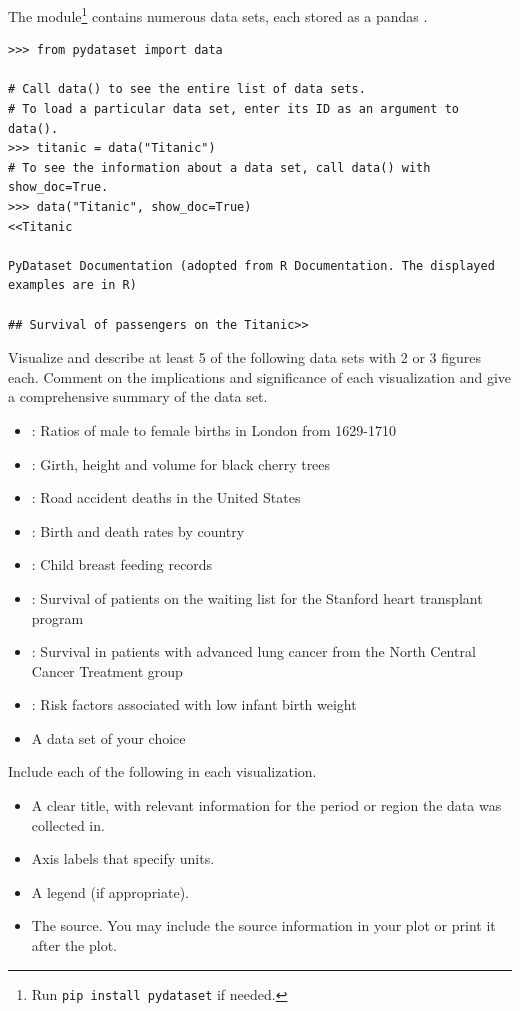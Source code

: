 \begin{problem}
The  module\footnote{Run \texttt{pip install pydataset} if needed.} contains numerous data sets, each stored as a pandas .

\begin{lstlisting}
>>> from pydataset import data

# Call data() to see the entire list of data sets.
# To load a particular data set, enter its ID as an argument to data().
>>> titanic = data("Titanic")
# To see the information about a data set, call data() with show_doc=True.
>>> data("Titanic", show_doc=True)
<<Titanic

PyDataset Documentation (adopted from R Documentation. The displayed
examples are in R)

## Survival of passengers on the Titanic>>
\end{lstlisting}

Visualize and describe at least 5 of the following data sets with 2 or 3 figures each.
Comment on the implications and significance of each visualization and give a comprehensive summary of the data set.

\begin{itemize}
\item {}: Ratios of male to female births in London from 1629-1710
\item {}: Girth, height and volume for black cherry trees
\item {}: Road accident deaths in the United States
\item {}: Birth and death rates by country
\item {}: Child breast feeding records
\item {}: Survival of patients on the waiting list for the Stanford heart transplant program
\item {}: Survival in patients with advanced lung cancer from the North Central Cancer Treatment group
\item {}: Risk factors associated with low infant birth weight
\item A data set of your choice
\end{itemize}
Include each of the following in each visualization.
\begin{itemize}
\item A clear title, with relevant information for the period or region the data was collected in.
\item Axis labels that specify units.
\item A legend (if appropriate).
\item The source.
You may include the source information in your plot or print it after the plot.
\end{itemize}
\end{problem}
